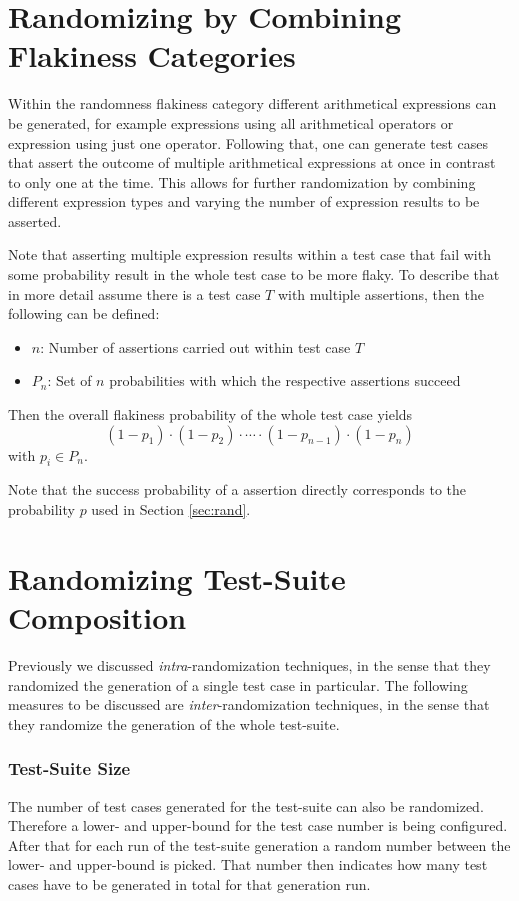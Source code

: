 \documentclass[
fancyheadings, %
%
%
]{stsreprt}
\begin{document}
\section{Randomizing by Combining Flakiness Categories}\label{sec:rand_by_comb}
Within the randomness flakiness category different arithmetical expressions can be generated, for example expressions using all arithmetical operators or expression using just one operator. 
Following that, one can generate test cases that assert the outcome of multiple arithmetical expressions at once in contrast to only one at the time.
This allows for further randomization by combining different expression types and varying the number of expression results to be asserted. \par
Note that asserting multiple expression results within a test case that fail with some probability result in the whole test case to be more flaky. 
To describe that in more detail assume there is a test case $T$ with multiple assertions, then the following can be defined:
\begin{itemize}
    \item $n$: Number of assertions carried out within test case $T$
    \item $P_n$: Set of $n$ probabilities with which the respective assertions succeed
\end{itemize}
Then the overall flakiness probability of the whole test case yields 
\[
    (1 - p_1) \cdot (1-p_2) \cdot \cdots \cdot (1-p_{n-1}) \cdot (1-p_{n})
\]
with $p_i \in P_n$. \par
Note that the success probability of a assertion directly corresponds to the probability $p$ used in Section \ref{sec:rand}.


\section{Randomizing Test-Suite Composition}
Previously we discussed \textit{intra}-randomization techniques, in the sense that they randomized the generation of a single test case in particular. 
The following measures to be discussed are \textit{inter}-randomization techniques, in the sense that they randomize the generation of the whole test-suite. \par

\subsubsection{Test-Suite Size}
The number of test cases generated for the test-suite can also be randomized. 
Therefore a lower- and upper-bound for the test case number is being configured.
After that for each run of the test-suite generation a random number between the lower- and upper-bound is picked. 
That number then indicates how many test cases have to be generated in total for that generation run. 
\end{document}
